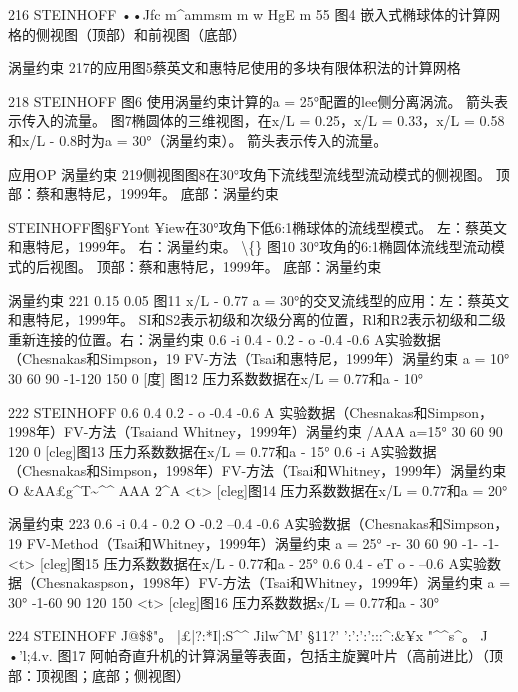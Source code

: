 \documentclass[UTF8,11pt,a4paper,openany,fontset=fandol]{ctexbook}
\begin{document}
216 STEINHOFF ••Jfc m\textasciicircum{}ammsm m w HgE m 55 图4 嵌入式椭球体的计算网格的侧视图（顶部）和前视图（底部）

涡量约束 217的应用图5蔡英文和惠特尼使用的多块有限体积法的计算网格

218 STEINHOFF 图6 使用涡量约束计算的a = 25°配置的lee侧分离涡流。 箭头表示传入的流量。 图7椭圆体的三维视图，在x/L = 0.25，x/L = 0.33，x/L = 0.58和x/L - 0.8时为a = 30°（涡量约束）。 箭头表示传入的流量。

应用OP 涡量约束 219侧视图图8在30°攻角下流线型流线型流动模式的侧视图。 顶部：蔡和惠特尼，1999年。 底部：涡量约束

STEINHOFF图§FYont ¥iew在30°攻角下低6:1椭球体的流线型模式。 左：蔡英文和惠特尼，1999年。 右：涡量约束。 \textbackslash\{\} 图10 30°攻角的6:1椭圆体流线型流动模式的后视图。 顶部：蔡和惠特尼，1999年。 底部：涡量约束

涡量约束 221 0.15 0.05 图11 x/L - 0.77 a = 30°的交叉流线型的应用：左：蔡英文和惠特尼，1999年。 SI和S2表示初级和次级分离的位置，Rl和R2表示初级和二级重新连接的位置。右：涡量约束 0.6 -i 0.4 - 0.2 - o -0.4 -0.6 A实验数据（Chesnakas和Simpson，19 FV-方法（Tsai和惠特尼，1999年）涡量约束 a = 10° 30 60 90 -1-120 150 0 [度] 图12 压力系数数据在x/L = 0.77和a - 10°

222 STEINHOFF 0.6 0.4 0.2 - o -0.4 -0.6 A 实验数据（Chesnakas和Simpson，1998年）FV-方法（Tsaiand Whitney，1999年）涡量约束 /AAA a=15° 30 60 90 120 0 [cleg]图13 压力系数数据在x/L = 0.77和a - 15° 0.6 -i A实验数据（Chesnakas和Simpson，1998年）FV-方法（Tsai和Whitney，1999年）涡量约束 O \&AA£g\textasciicircum{}T\textasciitilde{}\textasciicircum{}\textasciicircum{} AAA 2\textasciicircum{}A <t> [cleg]图14 压力系数数据在x/L = 0.77和a = 20°

涡量约束 223 0.6 -i 0.4 - 0.2 O -0.2 --0.4 -0.6 A实验数据（Chesnakas和Simpson，19 FV-Method（Tsai和Whitney，1999年）涡量约束 a = 25° -r- 30 60 90 -1- -1- <t> [cleg]图15 压力系数数据在x/L - 0.77和a - 25° 0.6 0.4 - eT o - --0.6 A实验数据（Chesnakaspson，1998年）FV-方法（Tsai和Whitney，1999年）涡量约束 a = 30° -1-60 90 120 150 <t> [cleg]图16 压力系数数据x/L = 0.77和a - 30°

224 STEINHOFF J@\$\$"。 |£|?:*I|:S\textasciicircum{}\textasciicircum{} Jilw\textasciicircum{}M' §11?' ':':':':::\textasciicircum{}:\&¥x "\textasciicircum{}\textasciicircum{}s\textasciicircum{}。 J •'l;4.v. 图17 阿帕奇直升机的计算涡量等表面，包括主旋翼叶片（高前进比）（顶部：顶视图；底部；侧视图）
\end{document}

